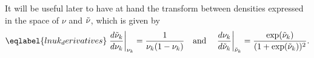 
%
%
%
%
%
%
%
%
It will be useful later to have at hand the transform between densities
expressed in the space of $\nu$ and $\tilde{\nu}$, which is given by
%
\begin{align}\eqlabel{lnuk_derivatives}
%
\fracat{d \lnu_\k}{ d\nuk}{\nuk} ={}
    \frac{1}{\nuk (1 - \nuk)} \mathand
%
\fracat{d \nuk}{ d\lnuk}{\lnuk} ={}
    \frac{\exp(\lnuk)}{(1 + \exp(\lnuk))^2}.
%
\end{align}
